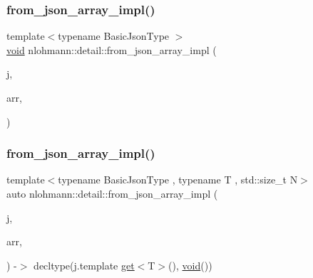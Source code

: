 \mbox{\label{namespacenlohmann_1_1detail_a40f7bb070a60e8ba14fffb9c117fcbd8}} 
\subsubsection{\texorpdfstring{from\+\_\+json\+\_\+array\+\_\+impl()}{from\_json\_array\_impl()}\hspace{0.1cm}{\footnotesize\ttfamily [1/4]}}
{\footnotesize\ttfamily template$<$typename Basic\+Json\+Type $>$ \\
\hyperlink{namespacenlohmann_1_1detail_a59fca69799f6b9e366710cb9043aa77d}{void} nlohmann\+::detail\+::from\+\_\+json\+\_\+array\+\_\+impl (\begin{DoxyParamCaption}\item[{const Basic\+Json\+Type \&}]{j,  }\item[{typename Basic\+Json\+Type\+::array\+\_\+t \&}]{arr,  }\item[{\hyperlink{structnlohmann_1_1detail_1_1priority__tag}{priority\+\_\+tag}$<$ 3 $>$}]{ }\end{DoxyParamCaption})}

\mbox{\label{namespacenlohmann_1_1detail_aba0ce45ebb69fd2c7132a00f9a56b503}} 
\subsubsection{\texorpdfstring{from\+\_\+json\+\_\+array\+\_\+impl()}{from\_json\_array\_impl()}\hspace{0.1cm}{\footnotesize\ttfamily [2/4]}}
{\footnotesize\ttfamily template$<$typename Basic\+Json\+Type , typename T , std\+::size\+\_\+t N$>$ \\
auto nlohmann\+::detail\+::from\+\_\+json\+\_\+array\+\_\+impl (\begin{DoxyParamCaption}\item[{const Basic\+Json\+Type \&}]{j,  }\item[{\hyperlink{namespacenlohmann_1_1detail_a1ed8fc6239da25abcaf681d30ace4985af1f713c9e000f5d3f280adbd124df4f5}{std\+::array}$<$ T, N $>$ \&}]{arr,  }\item[{\hyperlink{structnlohmann_1_1detail_1_1priority__tag}{priority\+\_\+tag}$<$ 2 $>$}]{ }\end{DoxyParamCaption}) -\/$>$ decltype(j.\+template \hyperlink{namespacenlohmann_1_1detail_acc422c11342b31368f610b6f96fcedc6}{get}$<$T$>$(), \hyperlink{namespacenlohmann_1_1detail_a59fca69799f6b9e366710cb9043aa77d}{void}())
}

